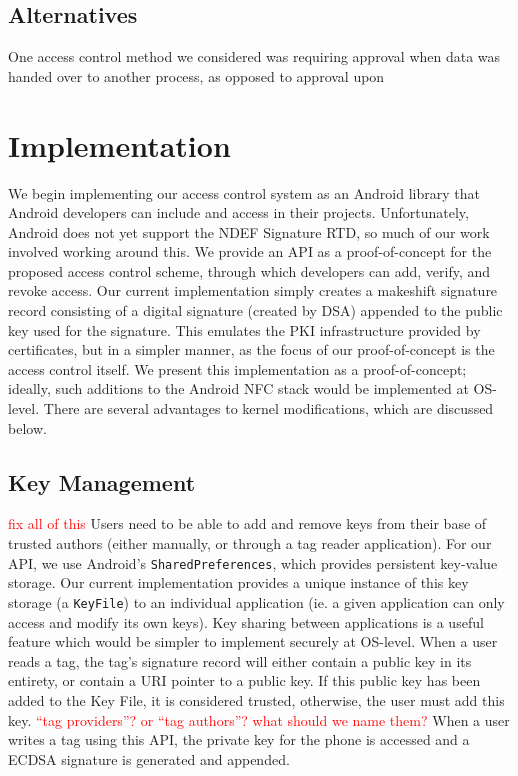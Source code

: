 \documentclass[12pt]{article}
\newcommand\TODO[1]{\textcolor{red}{#1}}
\newcommand\todo[1]{\textcolor{red}{#1}}
\begin{document}
\subsection{Alternatives}
One access control method we considered was requiring approval when data was handed over to another process, as opposed to approval upon 

\section{Implementation}
We begin implementing our access control system as an Android library that Android developers can include and access in their projects.
Unfortunately, Android does not yet support the NDEF Signature RTD, so much of our work involved working around this.
We provide an API as a proof-of-concept for the proposed access control scheme, through which developers can add, verify, and revoke access.
Our current implementation simply creates a makeshift signature record consisting of a digital signature (created by DSA) appended to the public key used for the signature.
This emulates the PKI infrastructure provided by certificates, but in a simpler manner, as the focus of our proof-of-concept is the access control itself.
We present this implementation as a proof-of-concept; ideally, such additions to the Android NFC stack would be implemented at OS-level.
There are several advantages to kernel modifications, which are discussed below.

\subsection{Key Management}
\todo{fix all of this}
Users need to be able to add and remove keys from their base of trusted authors (either manually, or through a tag reader application).
For our API, we use Android's \texttt{SharedPreferences}, which provides persistent key-value storage.
Our current implementation provides a unique instance of this key storage (a \texttt{KeyFile}) to an individual application (ie. a given application can only access and modify its own keys).
Key sharing between applications is a useful feature which would be simpler to implement securely at OS-level.
When a user reads a tag, the tag's signature record will either contain a public key in its entirety, or contain a URI pointer to a public key.
If this public key has been added to the Key File, it is considered trusted, otherwise, the user must add this key.
\TODO{``tag providers''? or ``tag authors''? what should we name them?}
When a user writes a tag using this API, the private key for the phone is accessed and a ECDSA signature is generated and appended.
\end{document}
